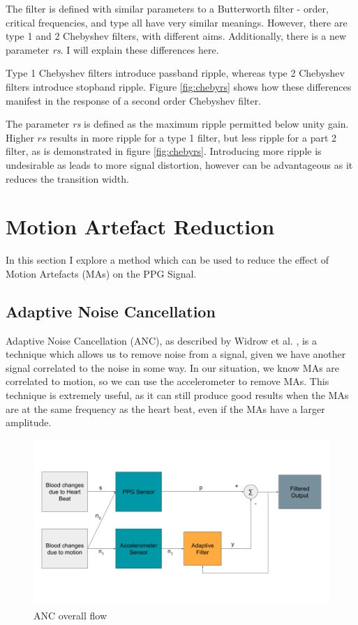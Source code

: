 \documentclass[12pt,a4paper,twoside,openright]{report}
\begin{document}
The filter is defined with similar parameters to a Butterworth filter - order,
critical frequencies, and type all have very similar meanings. However,
there are type 1 and 2 Chebyshev filters, with different aims. Additionally,
there is a new parameter \emph{rs}. I will explain these differences here.

Type 1 Chebyshev filters introduce passband ripple, whereas type 2 Chebyshev 
filters introduce stopband ripple. Figure \ref{fig:chebyrs} shows how these
differences manifest in the response of a second order Chebyshev filter.

The parameter \emph{rs} is defined as the maximum ripple permitted below unity
gain. Higher \(rs\) results in more ripple for a type 1 filter, but less
ripple for a part 2 filter, as is demonstrated in figure \ref{fig:chebyrs}.
Introducing more ripple is undesirable as leads to more signal distortion,
however can be advantageous as it reduces the transition width.

\section{Motion Artefact Reduction}

In this section I explore a method which can be used to reduce the effect of 
Motion Artefacts (MAs) on the PPG Signal.

\subsection{Adaptive Noise Cancellation}

Adaptive Noise Cancellation (ANC), as described by Widrow et al.
\cite{Widrow75}, is a technique which allows us to remove noise from a signal,
given we have another signal correlated to the noise in some way. In our 
situation, we know MAs are correlated to motion, so we can use the 
accelerometer to remove MAs. This technique is extremely useful, as it can 
still produce good results when the MAs are at the same frequency as the heart
beat, even if the MAs have a larger amplitude.



\begin{figure}[tbh]
	\centerline{\includegraphics[width=\textwidth]{figs/ANC-concept.png}}
\caption{ANC overall flow}
\label{epsfig}
\end{figure}
\end{document}
